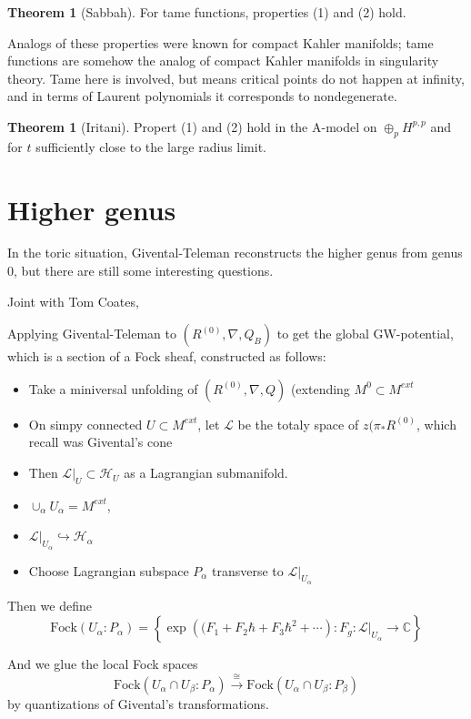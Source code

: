 \documentclass{amsart}
\theoremstyle{definition}
\newtheorem{theorem}[dummy]{Theorem}
\newcommand{\into}{\hookrightarrow}
\newcommand{\C}{\mathbb{C}}
\begin{document}
\begin{theorem}[Sabbah]
For tame functions, properties (1) and (2) hold.
\end{theorem}
Analogs of these properties were known for compact Kahler manifolds; tame functions are somehow the analog of compact Kahler manifolds in singularity theory.  Tame here is involved, but means critical points do not happen at infinity, and in terms of Laurent polynomials it corresponds to nondegenerate.

\begin{theorem}[Iritani]
Propert (1) and (2) hold in the A-model on $\oplus_p H^{p,p}$ and for $t$ sufficiently close to the large radius limit.
\end{theorem}

\section{Higher genus}
In the toric situation, Givental-Teleman reconstructs the higher genus from genus 0, but there are still some interesting questions.

Joint with Tom Coates, 

Applying Givental-Teleman to $(R^{(0)},\nabla, Q_B)$ to get the global GW-potential, which is a section of a Fock sheaf, constructed as follows:

\begin{itemize}
\item Take a miniversal unfolding of $(R^{(0)}, \nabla, Q)$ (extending $M^0\subset M^{ext}$
\item On simpy connected $U\subset M^{ext}$, let $\mathcal{L}$ be the totaly space of $z(\pi_* R^{(0)}$, which recall was Givental's cone
\item Then $\mathcal{L}|_U\subset \mathcal{H}_U$ as a Lagrangian submanifold.
\item $\cup_\alpha U_\alpha=M^{ext}$,
\item  $\mathcal{L}|_{U_\alpha}\into \mathcal{H}_\alpha$
\item Choose Lagrangian subspace $P_\alpha$ transverse to $\mathcal{L}|_{U_\alpha}$
\end{itemize}
Then we define
$$\text{Fock}(U_\alpha:P_\alpha)=\left\{ \exp\left((F_1+F_2\hbar+F_3\hbar^2+\cdots\right):F_g:\mathcal{L}|_{U_\alpha}\to\C\right\}$$

And we glue the local Fock spaces
$$\text{Fock}(U_\alpha\cap U_\beta:P_\alpha)\stackrel{\cong}\to \text{Fock}(U_\alpha\cap U_\beta:P_\beta)$$
by quantizations of Givental's transformations.
\end{document}
